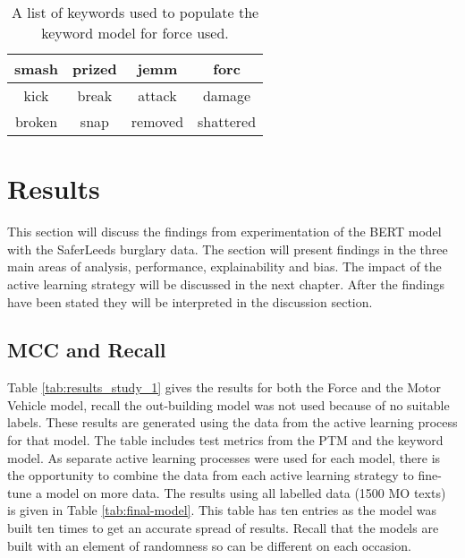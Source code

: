\begin{table}[]
\begin{tabular}{|c|c|c|c|}
\hline
smash  & prized & jemm    & forc      \\ \hline
kick   & break  & attack  & damage    \\ \hline
broken & snap   & removed & shattered \\ \hline
\end{tabular}
\caption{\label{tab:Keywords_force} A list of keywords used to populate the keyword model for force used.}
\end{table}





   

\section{Results} This section will discuss the findings from experimentation of the BERT model with the SaferLeeds burglary data. The section will present findings in the three main areas of analysis, performance, explainability and bias. The impact of the active learning strategy will be discussed in the next chapter. After the findings have been stated they will be interpreted in the discussion section.



\subsection{MCC and Recall} Table \ref{tab:results_study_1} gives the results for both the Force and the Motor Vehicle model, recall the out-building model was not used because of no suitable labels. These results are generated using the data from the active learning process for that model. The table includes test metrics from the PTM and the keyword model. As separate active learning processes were used for each model, there is the opportunity to combine the data from each active learning strategy to fine-tune a model on more data. The results using all labelled data (1500 MO texts) is given in Table \ref{tab:final-model}. This table has ten entries as the model was built ten times to get an accurate spread of results. Recall that the models are built with an element of randomness so can be different on each occasion.

